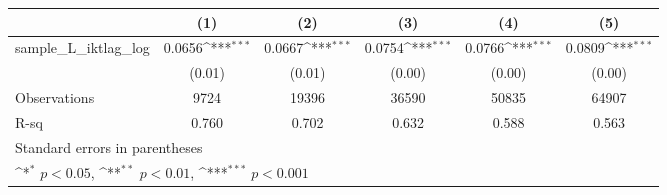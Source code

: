 {
\def\sym#1{\ifmmode^{#1}\else\(^{#1}\)\fi}
\begin{tabular}{l*{5}{c}}
\hline\hline
          &\multicolumn{1}{c}{(1)}         &\multicolumn{1}{c}{(2)}         &\multicolumn{1}{c}{(3)}         &\multicolumn{1}{c}{(4)}         &\multicolumn{1}{c}{(5)}         \\
\hline
sample\_L\_iktlag\_log&   0.0656\sym{***}&   0.0667\sym{***}&   0.0754\sym{***}&   0.0766\sym{***}&   0.0809\sym{***}\\
          &   (0.01)         &   (0.01)         &   (0.00)         &   (0.00)         &   (0.00)         \\
\hline
Observations&     9724         &    19396         &    36590         &    50835         &    64907         \\
R-sq      &    0.760         &    0.702         &    0.632         &    0.588         &    0.563         \\
\hline\hline
\multicolumn{6}{l}{\footnotesize Standard errors in parentheses}\\
\multicolumn{6}{l}{\footnotesize \sym{*} \(p<0.05\), \sym{**} \(p<0.01\), \sym{***} \(p<0.001\)}\\
\end{tabular}
}

